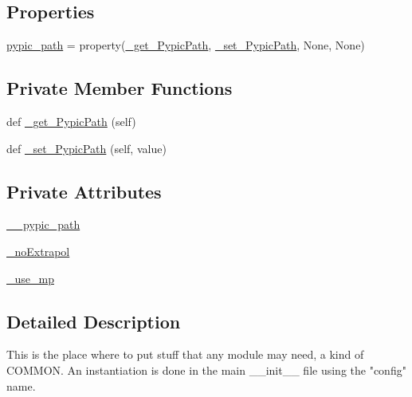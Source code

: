 \subsection*{Properties}
\begin{DoxyCompactItemize}
\item 
\hyperlink{classpyneb_1_1utils_1_1_config_1_1___config_a5276927da3588ffb009fd79f282c6d3c}{pypic\+\_\+path} = property(\hyperlink{classpyneb_1_1utils_1_1_config_1_1___config_a949b65b35f3bf0e60390e28460818aba}{\+\_\+get\+\_\+\+Pypic\+Path}, \hyperlink{classpyneb_1_1utils_1_1_config_1_1___config_a6d13ed9c4ac0d9fee12cc38de10fe9d2}{\+\_\+set\+\_\+\+Pypic\+Path}, None, None)
\end{DoxyCompactItemize}
\subsection*{Private Member Functions}
\begin{DoxyCompactItemize}
\item 
def \hyperlink{classpyneb_1_1utils_1_1_config_1_1___config_a949b65b35f3bf0e60390e28460818aba}{\+\_\+get\+\_\+\+Pypic\+Path} (self)
\item 
def \hyperlink{classpyneb_1_1utils_1_1_config_1_1___config_a6d13ed9c4ac0d9fee12cc38de10fe9d2}{\+\_\+set\+\_\+\+Pypic\+Path} (self, value)
\end{DoxyCompactItemize}
\subsection*{Private Attributes}
\begin{DoxyCompactItemize}
\item 
\hyperlink{classpyneb_1_1utils_1_1_config_1_1___config_a1c122165aa8885ce11f9bf86d08c40cd}{\+\_\+\+\_\+pypic\+\_\+path}
\item 
\hyperlink{classpyneb_1_1utils_1_1_config_1_1___config_a0fd9f60b73f8af4fda56fed8c6683a1c}{\+\_\+no\+Extrapol}
\item 
\hyperlink{classpyneb_1_1utils_1_1_config_1_1___config_a29aefac8a5bc01cb564c9fc12755fe7c}{\+\_\+use\+\_\+mp}
\end{DoxyCompactItemize}


\subsection{Detailed Description}
\begin{DoxyVerb}This is the place where to put stuff that any module may need, a kind of COMMON.
An instantiation is done in the main __init__ file using the "config" name.\end{DoxyVerb}
 

